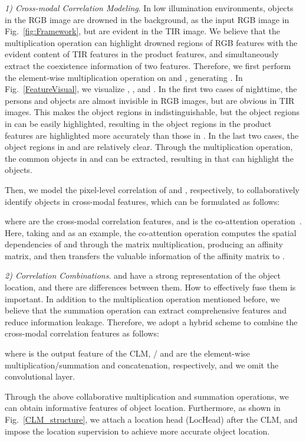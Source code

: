 \documentclass[journal]{IEEEtran}
\begin{document}
\textit{1) Cross-modal Correlation Modeling}.
In low illumination environments, objects in the RGB image are drowned in the background, as the input RGB image in Fig.~\ref{fig:Framework}, but are evident in the TIR image.
We believe that the multiplication operation can highlight drowned regions of RGB features with the evident content of TIR features in the product features, and simultaneously extract the coexistence information of two features.
Therefore, we first perform the element-wise multiplication operation on  and  , generating .
In Fig.~\ref{FeatureVisual}, we visualize , , and .
In the first two cases of nighttime, the persons and objects are almost invisible in RGB images, but are obvious in TIR images.
This makes the object regions in  indistinguishable, but the object regions in  can be easily highlighted, resulting in the object regions in the product features  are highlighted more accurately than those in .
In the last two cases, the object regions in  and  are relatively clear.
Through the multiplication operation, the common objects in  and  can be extracted, resulting in that  can highlight the objects.



Then, we model the pixel-level correlation of  and , respectively, to collaboratively identify objects in cross-modal features, which can be formulated as follows:

where  are the cross-modal correlation features, and  is the co-attention operation~\cite{2016CoAtt}.
Here, taking  and  as an example, the co-attention operation  computes the spatial dependencies of  and  through the matrix multiplication, producing an affinity matrix, and then transfers the valuable information of the affinity matrix to .



\textit{2) Correlation Combinations}.
 and  have a strong representation of the object location, and there are differences between them.
How to effectively fuse them is important.
In addition to the multiplication operation mentioned before, we believe that the summation operation can extract comprehensive features and reduce information leakage.
Therefore, we adopt a hybrid scheme to combine the cross-modal correlation features as follows:

where  is the output feature of the CLM, / and  are the element-wise multiplication/summation and concatenation, respectively, and we omit the convolutional layer.

Through the above collaborative multiplication and summation operations, we can obtain informative features of object location.
Furthermore, as shown in Fig.~\ref{CLM_structure}, we attach a location head (LocHead) after the CLM, and impose the location supervision to achieve more accurate object location.
\end{document}
